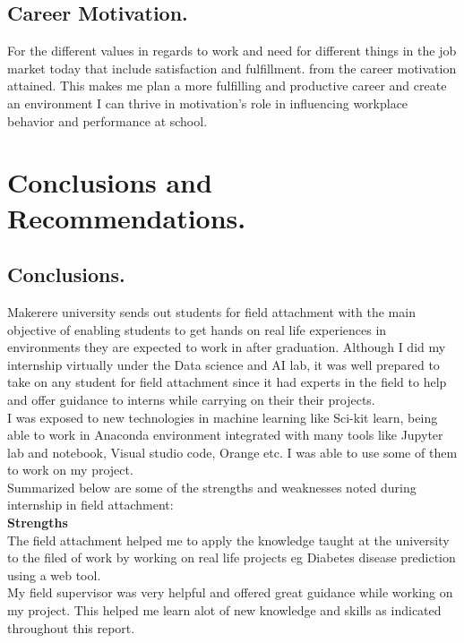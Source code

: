 \documentclass[11pt]{article}
\begin{document}
\subsection{Career Motivation.}
For the different values in regards to work and need for different things in the job market today
that include satisfaction and fulfillment. from the career motivation attained. This makes me plan
a more fulfilling and productive career and create an environment I can thrive in motivation's role
in influencing workplace behavior and performance at school.\\


\newpage
\section{Conclusions and Recommendations.}\label{sec:intro}
\subsection{Conclusions.}
Makerere university sends out students for field attachment with the main objective of enabling students to get hands on real life experiences in environments they are expected to work in after graduation. Although I did my internship virtually under the Data science and AI lab, it was well prepared to take on any student for field attachment since it had experts in the field to help and offer guidance to interns while carrying on their their projects.\\

I was exposed to new technologies in machine learning like Sci-kit learn, being able to work in Anaconda environment integrated with many tools like Jupyter lab and notebook, Visual studio code, Orange etc. I was able to use some of them to work on my project.\\

Summarized below are some of the strengths and weaknesses noted during internship in field attachment:\\
\textbf{Strengths}\\
The field attachment helped me to apply the knowledge taught at the university to the filed of work by working on real life projects eg Diabetes disease prediction using a web tool.\\  
My field supervisor was very helpful and offered great guidance while working on my project. This helped me learn alot of new knowledge and skills as indicated throughout this report.\\
\end{document}
